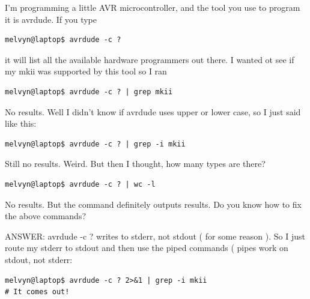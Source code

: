 \documentclass[10pt]{article}
\begin{document}
I'm programming a little AVR microcontroller, and the tool you use to program it
is avrdude. If you type 
\begin{lstlisting}[style=term]
melvyn@laptop$ avrdude -c ?
\end{lstlisting}

it will list all the available hardware programmers out there. I wanted ot see
if my mkii was supported by this tool so I ran

\begin{lstlisting}[style=term]
melvyn@laptop$ avrdude -c ? | grep mkii
\end{lstlisting}

No results. Well I didn't know if avrdude uses upper or lower case, so I just
said like this:

\begin{lstlisting}[style=term]
melvyn@laptop$ avrdude -c ? | grep -i mkii
\end{lstlisting}

Still no results. Weird. But then I thought, how many types are there?

\begin{lstlisting}[style=term]
melvyn@laptop$ avrdude -c ? | wc -l
\end{lstlisting}

No results. But the command definitely outputs results. Do you know how to fix
the above commands?

ANSWER: avrdude -c ?  writes to stderr, not stdout ( for some reason ). So I
just route my stderr to stdout and then use the piped commands ( pipes work on
stdout, not stderr:

\begin{lstlisting}[style=term]
melvyn@laptop$ avrdude -c ? 2>&1 | grep -i mkii
# It comes out!
\end{lstlisting}
\end{document}
